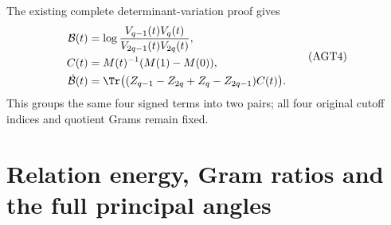 The existing complete determinant-variation proof gives
\[
 \begin{aligned}
 \mathcal B(t)&=\log\frac{V_{q-1}(t)V_q(t)}
                              {V_{2q-1}(t)V_{2q}(t)},\\
 C(t)&=M(t)^{-1}(M(1)-M(0)),\\
 \dot{\mathcal B}(t)
 &=\Tr\bigl((Z_{q-1}-Z_{2q}+Z_q-Z_{2q-1})C(t)\bigr).
 \end{aligned}
 \tag{AGT4}
\]
This groups the same four signed terms into two pairs; all four
original cutoff indices and quotient Grams remain fixed.

\section{Relation energy, Gram ratios and the full principal angles}

